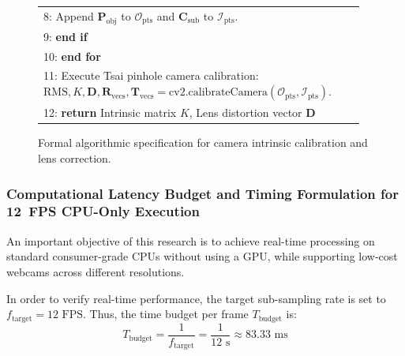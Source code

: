 \begin{figure}[htbp]
\begin{minipage}{0.92\textwidth}
\begin{tabular}{|p{0.96\linewidth}|}
{\small 8: \hspace{2em} Append $\mathbf{P}_{\text{obj}}$ to $\mathcal{O}_{\text{pts}}$ and $\mathbf{C}_{\text{sub}}$ to $\mathcal{I}_{\text{pts}}$.} \\
{\small 9: \hspace{1em} \textbf{end if}} \\
{\small 10: \textbf{end for}} \\
{\small 11: Execute Tsai pinhole camera calibration: $\text{RMS}, K, \mathbf{D}, \mathbf{R}_{\text{vecs}}, \mathbf{T}_{\text{vecs}} = \text{cv2.calibrateCamera}(\mathcal{O}_{\text{pts}}, \mathcal{I}_{\text{pts}})$.} \\
{\small 12: \textbf{return} Intrinsic matrix $K$, Lens distortion vector $\mathbf{D}$} \\
\hline
\end{tabular}
\end{minipage}
\caption{Formal algorithmic specification for camera intrinsic calibration and lens correction.}
\label{alg:camera_calibration}
\end{figure}

\subsubsection{Computational Latency Budget and Timing Formulation for 12~FPS CPU-Only Execution}
\label{subsubsec:imp_cpu_latency_budget}
An important objective of this research is to achieve real-time processing on standard consumer-grade CPUs without using a GPU, while supporting low-cost webcams across different resolutions.

In order to verify real-time performance, the target sub-sampling rate is set to $f_{\text{target}} = 12\text{ FPS}$. Thus, the time budget per frame $T_{\text{budget}}$ is:
\begin{equation}
T_{\text{budget}} = \frac{1}{f_{\text{target}}} = \frac{1}{12\text{ s}} \approx 83.33\text{ ms}
\label{eq:frame_budget}
\end{equation}

